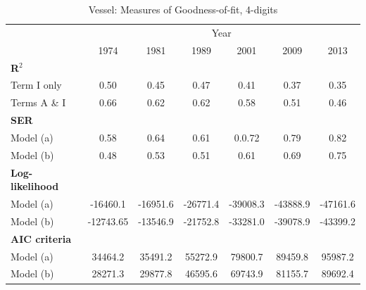 \documentclass[a4paper,11pt]{article}
\begin{document}
\begin{table}[htbp]
  \centering
  \caption{Vessel: Measures of Goodness-of-fit, 4-digits}
\begin{center}
\label{tab:good_fit_ves_rob}%
  \footnotesize{
\begin{tabular}{l|cccccc}
\hline
\hline
      & \multicolumn{6}{c}{Year}                   \\
      & \multicolumn{1}{c}{1974} & \multicolumn{1}{c}{1981} & \multicolumn{1}{c}{1989} & \multicolumn{1}{c}{2001} & \multicolumn{1}{c}{2009} & \multicolumn{1}{c}{2013}  \\ \hline
\boldmath{}\textbf{R$^{2}$}\unboldmath{} &       &       &       &       &       &         \\
Term I only & 0.50  & 0.45  & \multicolumn{1}{c}{0.47} & \multicolumn{1}{c}{0.41} & \multicolumn{1}{c}{0.37} & \multicolumn{1}{c}{0.35} \\
Terms A \& I & 0.66  & 0.62  & \multicolumn{1}{c}{0.62} & \multicolumn{1}{c}{0.58} & \multicolumn{1}{c}{0.51} & \multicolumn{1}{c}{0.46} \\
\textbf{SER} &       &       & \multicolumn{1}{c}{} & \multicolumn{1}{c}{} & \multicolumn{1}{c}{} & \multicolumn{1}{c}{} \\
Model (a) &    0.58   &   0.64    & \multicolumn{1}{c}{0.61} & \multicolumn{1}{c}{0.0.72} & \multicolumn{1}{c}{0.79} & \multicolumn{1}{c}{0.82} \\
Model (b) &   0.48    &    0.53   & \multicolumn{1}{c}{0.51} & \multicolumn{1}{c}{0.61} & \multicolumn{1}{c}{0.69} & \multicolumn{1}{c}{0.75} \\
\textbf{Log-likelihood} &       &       & \multicolumn{1}{c}{} & \multicolumn{1}{c}{} & \multicolumn{1}{c}{} & \multicolumn{1}{c}{} \\
Model (a)& -16460.1 & -16951.6 & \multicolumn{1}{c}{-26771.4} & \multicolumn{1}{c}{-39008.3} & \multicolumn{1}{c}{-43888.9} & \multicolumn{1}{c}{-47161.6} \\
Model (b) & -12743.65 & -13546.9 & \multicolumn{1}{c}{-21752.8} & \multicolumn{1}{c}{-33281.0} & \multicolumn{1}{c}{-39078.9} & \multicolumn{1}{c}{-43399.2}  \\
\textbf{AIC criteria} &       &       & \multicolumn{1}{c}{} & \multicolumn{1}{c}{} & \multicolumn{1}{c}{} & \multicolumn{1}{c}{} \\
Model (a) & 34464.2 & 35491.2 & \multicolumn{1}{c}{55272.9} & \multicolumn{1}{c}{79800.7} & \multicolumn{1}{c}{89459.8} & \multicolumn{1}{c}{95987.2}\\
Model (b) & 28271.3 & 29877.8 & \multicolumn{1}{c}{46595.6} & \multicolumn{1}{c}{69743.9} & \multicolumn{1}{c}{81155.7} & \multicolumn{1}{c}{89692.4} \\

\end{tabular}}
\end{center}
\end{table}
\end{document}
